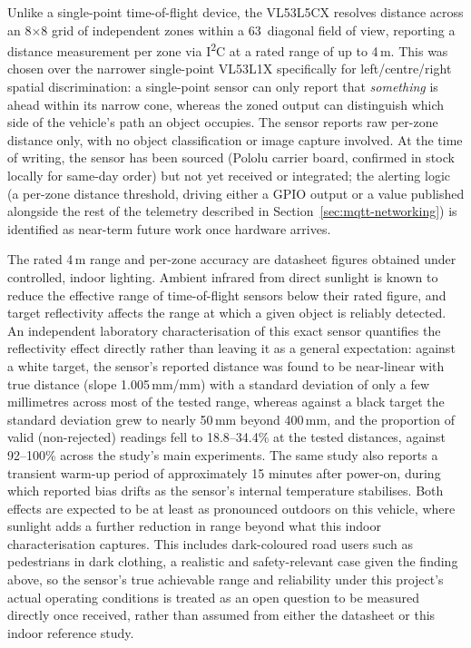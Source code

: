 Unlike a single-point time-of-flight device, the VL53L5CX resolves distance across an 8$\times$8 grid of independent zones within a 63\textdegree\ diagonal field of view, reporting a distance measurement per zone via I\textsuperscript{2}C at a rated range of up to 4\,m. This was chosen over the narrower single-point VL53L1X specifically for left/centre/right spatial discrimination: a single-point sensor can only report that \emph{something} is ahead within its narrow cone, whereas the zoned output can distinguish which side of the vehicle's path an object occupies. The sensor reports raw per-zone distance only, with no object classification or image capture involved. At the time of writing, the sensor has been sourced (Pololu carrier board, confirmed in stock locally for same-day order) but not yet received or integrated; the alerting logic (a per-zone distance threshold, driving either a GPIO output or a value published alongside the rest of the telemetry described in Section~\ref{sec:mqtt-networking}) is identified as near-term future work once hardware arrives.

The rated 4\,m range and per-zone accuracy are datasheet figures obtained under controlled, indoor lighting. Ambient infrared from direct sunlight is known to reduce the effective range of time-of-flight sensors below their rated figure, and target reflectivity affects the range at which a given object is reliably detected. An independent laboratory characterisation of this exact sensor \cite{caroleo2026} quantifies the reflectivity effect directly rather than leaving it as a general expectation: against a white target, the sensor's reported distance was found to be near-linear with true distance (slope 1.005\,mm/mm) with a standard deviation of only a few millimetres across most of the tested range, whereas against a black target the standard deviation grew to nearly 50\,mm beyond 400\,mm, and the proportion of valid (non-rejected) readings fell to 18.8--34.4\% at the tested distances, against 92--100\% across the study's main experiments. The same study also reports a transient warm-up period of approximately 15 minutes after power-on, during which reported bias drifts as the sensor's internal temperature stabilises. Both effects are expected to be at least as pronounced outdoors on this vehicle, where sunlight adds a further reduction in range beyond what this indoor characterisation captures. This includes dark-coloured road users such as pedestrians in dark clothing, a realistic and safety-relevant case given the finding above, so the sensor's true achievable range and reliability under this project's actual operating conditions is treated as an open question to be measured directly once received, rather than assumed from either the datasheet or this indoor reference study.


